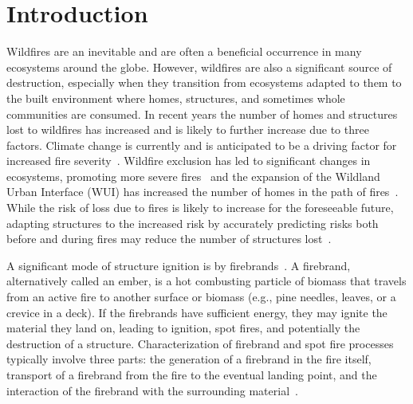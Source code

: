 
\chapter{Introduction}
\label{chap:intro}
    Wildfires are an inevitable and are often a  beneficial occurrence in many ecosystems around the globe. However, wildfires are also a significant source of destruction, especially when they transition from ecosystems adapted to them to the built environment where homes, structures, and sometimes whole communities are consumed. In recent years the number of homes and structures lost to wildfires has increased and is likely to further increase due to three factors. Climate change is currently and is anticipated to be a driving factor for increased fire severity~\cite{Levin2021Unveiling2019/2020}. Wildfire exclusion has led to significant changes in ecosystems, promoting more severe fires~\cite{Marlon2012Long-termUSA, Keeley2019} and the expansion of the Wildland Urban Interface (WUI) has increased the number of homes in the path of fires~\cite{Radeloff2018RapidRisk, Hammer2009DemographicManagement, }. While the risk of loss due to fires is likely to increase for the foreseeable future, adapting structures to the increased risk by accurately predicting risks both before and during fires may reduce the number of structures lost~\cite{Manzello2021}. 
    
   A significant mode of structure ignition is by firebrands~\cite{Manzello2020}. A firebrand, alternatively called an ember, is a hot combusting particle of biomass that travels from an active fire to another surface or biomass (e.g., pine needles, leaves, or a crevice in a deck). If the firebrands have sufficient energy, they may ignite the material they land on, leading to ignition, spot fires, and potentially the destruction of a structure. Characterization of firebrand and spot fire processes typically involve three parts: the generation of a firebrand in the fire itself, transport of a firebrand from the fire to the eventual landing point, and the interaction of the firebrand with the surrounding material~\cite{Babrauskas2003}. 
    
